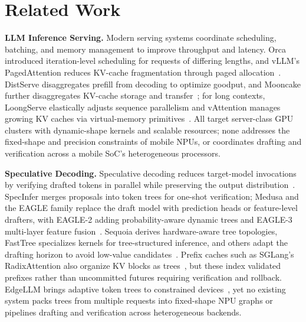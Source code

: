 \documentclass[sigconf,nonacm,10pt]{acmart}
\begin{document}
{{\section{Related Work}
\noindent\textbf{LLM Inference Serving.} Modern serving systems coordinate scheduling, batching, and memory management to improve throughput and latency. Orca introduced iteration-level scheduling for requests of differing lengths, and vLLM's PagedAttention reduces KV-cache fragmentation through paged allocation~\cite{Orca2022Gyeong,Efficient2023Woosuk}. DistServe disaggregates prefill from decoding to optimize goodput, and Mooncake further disaggregates KV-cache storage and transfer~\cite{DistServe2024Zhong,Mooncake2025Qin}; for long contexts, LoongServe elastically adjusts sequence parallelism and vAttention manages growing KV caches via virtual-memory primitives~\cite{LoongServe2024Wu,vAttention2025Prabhu}. All target server-class GPU clusters with dynamic-shape kernels and scalable resources; none addresses the fixed-shape and precision constraints of mobile NPUs, or coordinates drafting and verification across a mobile SoC's heterogeneous processors.

\noindent\textbf{Speculative Decoding.} Speculative decoding reduces target-model invocations by verifying drafted tokens in parallel while preserving the output distribution~\cite{leviathan2023fast,chen2023accelerating}. SpecInfer merges proposals into token trees for one-shot verification; Medusa and the EAGLE family replace the draft model with prediction heads or feature-level drafters, with EAGLE-2 adding probability-aware dynamic trees and EAGLE-3 multi-layer feature fusion~\cite{miao2024specinfer,cai2024medusa,li2024eagle,li2024eagle2,li2025eagle3}. Sequoia derives hardware-aware tree topologies, FastTree specializes kernels for tree-structured inference, and others adapt the drafting horizon to avoid low-value candidates~\cite{chen2024sequoia,pan2025fasttree,zhang2025svip,brown2024dynamicdepth,chen2026dflash}. Prefix caches such as SGLang's RadixAttention also organize KV blocks as trees~\cite{sglang2024}, but these index validated prefixes rather than uncommitted futures requiring verification and rollback. EdgeLLM brings adaptive token trees to constrained devices~\cite{xu2025edgellm}, yet no existing system packs trees from multiple requests into fixed-shape NPU graphs or pipelines drafting and verification across heterogeneous backends.

}}
\end{document}
